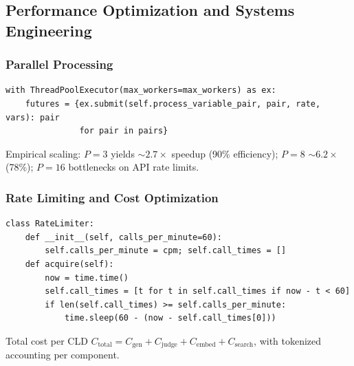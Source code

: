 


\subsection{Performance Optimization and Systems Engineering}

\subsubsection{Parallel Processing}
\begin{verbatim}
with ThreadPoolExecutor(max_workers=max_workers) as ex:
    futures = {ex.submit(self.process_variable_pair, pair, rate, vars): pair
               for pair in pairs}
\end{verbatim}
Empirical scaling: \(P=3\) yields \(\sim 2.7\times\) speedup (90\% efficiency); \(P=8\) \(\sim 6.2\times\) (78\%); \(P=16\) bottlenecks on API rate limits.

\subsubsection{Rate Limiting and Cost Optimization}
\begin{verbatim}
class RateLimiter:
    def __init__(self, calls_per_minute=60):
        self.calls_per_minute = cpm; self.call_times = []
    def acquire(self):
        now = time.time()
        self.call_times = [t for t in self.call_times if now - t < 60]
        if len(self.call_times) >= self.calls_per_minute:
            time.sleep(60 - (now - self.call_times[0]))
\end{verbatim}
Total cost per CLD \(C_{\text{total}} = C_{\text{gen}} + C_{\text{judge}} + C_{\text{embed}} + C_{\text{search}}\), with tokenized accounting per component.

